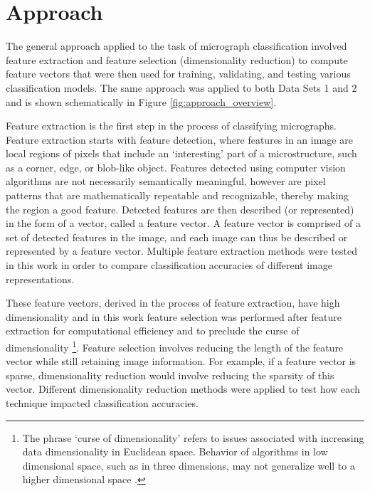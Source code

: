 \section{Approach}
\label{approach}
%
The general approach applied to the task of micrograph classification involved feature extraction and feature selection (dimensionality reduction) to compute feature vectors that were then used for training, validating, and testing various classification models.  The same approach was applied to both Data Sets 1 and 2 and is shown schematically in Figure \ref{fig:approach_overview}.

Feature extraction is the first step in the process of classifying micrographs.  Feature extraction starts with feature detection, where features in an image are local regions of pixels that include an `interesting' part of a microstructure, such as a corner, edge, or blob-like object. Features detected using computer vision algorithms are not necessarily semantically meaningful, however are pixel patterns that are mathematically repeatable and recognizable, thereby making the region a good feature. Detected features are then described (or represented) in the form of a vector, called a feature vector. A feature vector is comprised of a set of detected features in the image, and each image can thus be described or represented by a feature vector.  Multiple feature extraction methods were tested in this work in order to compare classification accuracies of different image representations.   
%

These feature vectors, derived in the process of feature extraction, have high dimensionality and in this work feature selection was performed after feature extraction for computational efficiency and to preclude the curse of dimensionality \footnote{The phrase `curse of dimensionality' refers to issues associated with increasing data dimensionality in Euclidean space.  Behavior of algorithms in low dimensional space, such as in three dimensions, may not generalize well to a higher dimensional space \cite{Keogh2010}.}.  Feature selection involves reducing the length of the feature vector while still retaining image information.  For example, if a feature vector is sparse, dimensionality reduction would involve reducing the sparsity of this vector.  Different dimensionality reduction methods were applied to test how each technique impacted classification accuracies.   

